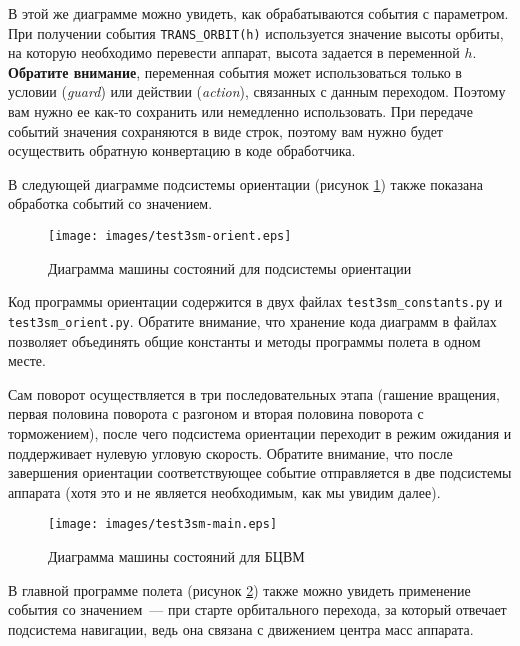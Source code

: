 \documentclass[12pt,a4paper]{article}
\begin{document}
В этой же диаграмме можно увидеть, как обрабатываются события с параметром. При получении
события \verb'TRANS_ORBIT(h)' используется значение высоты орбиты, на которую необходимо
перевести аппарат, высота задается в переменной $h$. \textbf{Обратите внимание},
переменная события может использоваться только в условии (\emph{guard}) или действии
(\emph{action}), связанных с данным переходом. Поэтому вам нужно ее как-то сохранить или
немедленно использовать. При передаче событий значения сохраняются в виде строк, поэтому
вам нужно будет осуществить обратную конвертацию в коде обработчика.

В следующей диаграмме подсистемы ориентации (рисунок \ref{Pic:Test3SM-Orient}) также показана
обработка событий со значением.

\begin{figure}[tbh]
  \begin{center}
    \texttt{[image: images/test3sm-orient.eps]}
    \caption{Диаграмма машины состояний для подсистемы ориентации}
    \label{Pic:Test3SM-Orient}
  \end{center}
\end{figure}

Код программы ориентации содержится в двух файлах \verb'test3sm_constants.py' и
\verb'test3sm_orient.py'. Обратите внимание, что хранение кода диаграмм в файлах позволяет
объединять общие константы и методы программы полета в одном месте.

Сам поворот осуществляется в три последовательных этапа (гашение вращения, первая половина
поворота с разгоном и вторая половина поворота с торможением), после чего подсистема
ориентации переходит в режим ожидания и поддерживает нулевую угловую скорость. Обратите
внимание, что после завершения ориентации соответствующее событие отправляется в две
подсистемы аппарата (хотя это и не является необходимым, как мы увидим далее).

\begin{figure}[tbh]
  \begin{center}
    \texttt{[image: images/test3sm-main.eps]}
    \caption{Диаграмма машины состояний для БЦВМ}
    \label{Pic:Test3SM-Main}
  \end{center}
\end{figure}

В главной программе полета (рисунок \ref{Pic:Test3SM-Main}) также можно увидеть применение
события со значением~--- при старте орбитального перехода, за который отвечает подсистема
навигации, ведь она связана с движением центра масс аппарата.
\end{document}
